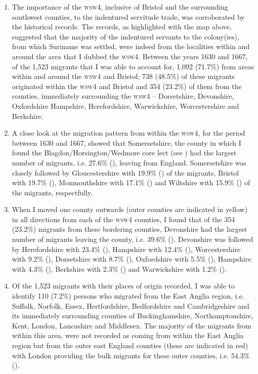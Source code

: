 \begin{enumerate}
\item{The importance of the \textsc{wsw4}, inclusive of Bristol and the surrounding southwest counties, to the indentured servitude trade, was corroborated by the historical records. The records, as highlighted with the map above, suggested that the majority of the indentured servants to the colony(ies), from which Suriname was settled, were indeed from the localities within and around the area that I dubbed the \textsc{wsw4}. Between the years 1630 and 1667, of the 1,523 migrants that I was able to account for, 1,092 (71.7\%) from areas within and around the \textsc{wsw4} and Bristol; 738 (48.5\%) of these migrants originated within the \textsc{wsw4} and Bristol and 354 (23.2\%) of them from the counties, immediately surrounding the \textsc{wsw4} -- Dorsetshire, Devonshire, Oxfordshire Hampshire, Herefordshire, Warwickshire, Worcestershire and Berkshire.}
\item{A close look at the migration pattern from within the \textsc{wsw4}, for the period between 1630 and 1667, showed that Somersetshire, the county in which I found the Blagdon/Horsington/Wedmore core lect (see ) had the largest number of migrants, i.e. 27.6\% (), leaving from England. Somersetshire was closely followed by Gloucestershire with 19.9\% () of the migrants, Bristol with  19.7\% (), Monmouthshire with  17.1\% () and Wiltshire with 15.9\% () of the migrants, respectfully.}
\item{When I moved one county outwards (outer counties are indicated in yellow) in all directions from each of the \textsc{wsw4} counties, I found that of the 354 (23.2\%) migrants from these bordering counties, Devonshire had the largest number of migrants leaving the county, i.e. 39.6\% (). Devonshire was followed by Herefordshire with 23.4\% (), Hampshire with 12.4\% (), Worcestershire with 9.2\% (), Dorsetshire with 8.7\% (), Oxfordshire with 5.5\% (), Hampshire with 4.3\% (), Berkshire with 2.3\% () and Warwickshire with 1.2\% ().}
\item{Of the 1,523 migrants with their places of origin recorded, I was able to identify 110 (7.2\%) persons who migrated from the East Anglia region, i.e. Suffolk, Norfolk, Essex, Hertfordshire, Bedfordshire and Cambridgeshire and its immediately surrounding counties of Buckinghamshire, Northamptonshire, Kent, London, Lancashire and Middlesex. The majority of the migrants from within this area, were not recorded as coming from within the East Anglia region but from the outer east England counties (these are indicated in red) with London providing the bulk migrants for these outer counties, i.e. 54.3\% ().}

\end{enumerate}
